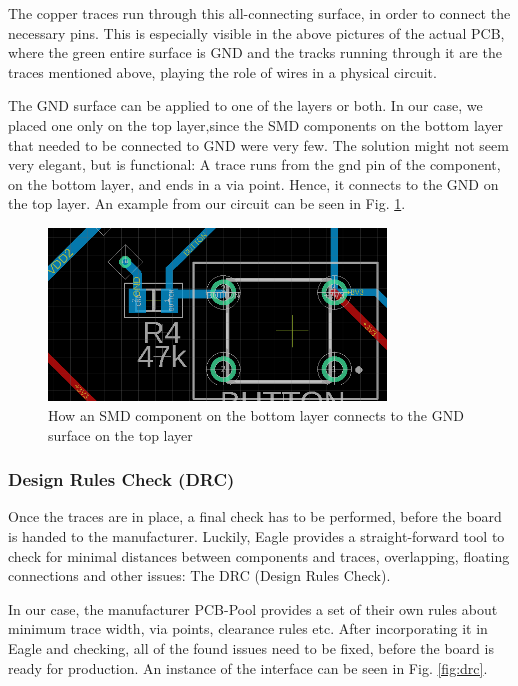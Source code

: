 The copper traces run through this all-connecting surface, in order to connect the necessary pins. This is especially visible in the above pictures of the actual PCB, where the green entire surface is GND and the tracks running through it are the traces mentioned above, playing the role of wires in a physical circuit.

The GND surface can be applied to one of the layers or both. In our case, we placed one only on the top layer,since the SMD components on the bottom layer that needed to be connected to GND were very few. The solution might not seem very elegant, but is functional: A trace runs from the gnd pin of the component, on the bottom layer, and ends in a via point. Hence, it connects to the GND on the top layer. An example from our circuit can be seen in Fig. \ref{fig:via}.

\begin{figure}[htb]
    \centering
    \includegraphics[width=0.8\textwidth]{figures/hardware/Via.PNG}
    \caption{How an SMD component on the bottom layer connects to the GND surface on the top layer}
    \label{fig:via}
\end{figure}

\FloatBarrier

\subsubsection{Design Rules Check (DRC)}

Once the traces are in place, a final check has to be performed, before the board is handed to the manufacturer. Luckily, Eagle provides a straight-forward tool to check for minimal distances between components and traces, overlapping, floating connections and other issues: The DRC (Design Rules Check).

In our case, the manufacturer PCB-Pool provides a set of their own rules about minimum trace width, via points, clearance rules etc. After incorporating it in Eagle and checking, all of the found issues need to be fixed, before the board is ready for production.
An instance of the interface can be seen in Fig. \ref{fig:drc}.

